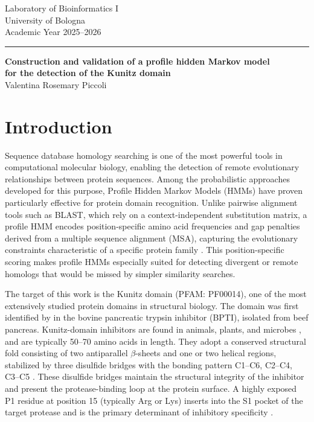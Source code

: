 \documentclass[11pt, a4paper]{article}
\begin{document}
{\centering
\footnotesize
Laboratory of Bioinformatics I \\
University of Bologna \\
Academic Year 2025--2026\par}




\noindent\rule{\textwidth}{0.4pt} %

\begin{center}
    {\Large\textbf{Construction and validation of a profile hidden Markov model\\
    for the detection of the Kunitz domain}} \\[8pt]
    {\normalsize Valentina Rosemary Piccoli}
\end{center}



\section{Introduction}
Sequence database homology searching is one of the most powerful tools in computational molecular biology, enabling the detection of remote 
evolutionary relationships between protein sequences. Among the probabilistic approaches developed for this purpose, Profile Hidden Markov 
Models (HMMs) have proven particularly effective for protein domain recognition. Unlike pairwise alignment tools such as BLAST, which rely on 
a context-independent substitution matrix, a profile HMM encodes position-specific amino acid frequencies and gap penalties derived from a 
multiple sequence alignment (MSA), capturing the evolutionary constraints characteristic of a specific protein family \cite{Eddy2011}. This 
position-specific scoring makes profile HMMs especially suited for detecting divergent or remote homologs that would be missed by simpler 
similarity searches.

The target of this work is the Kunitz domain (PFAM: PF00014), one of the most extensively studied protein domains in structural biology. The 
domain was first identified by \cite{Kunitz1936} in the bovine pancreatic trypsin inhibitor (BPTI), isolated from beef pancreas. Kunitz-domain 
inhibitors are found in animals, plants, and microbes \cite{Laskowski1980}, and are typically 50--70 amino acids in length. They adopt a 
conserved structural fold consisting of two antiparallel $\beta$-sheets and one or two helical regions, stabilized by three disulfide bridges 
with the bonding pattern C1--C6, C2--C4, C3--C5 \cite{Mishra2020}.
These disulfide bridges maintain the structural integrity of the inhibitor and present the protease-binding loop at the protein surface. 
A highly exposed P1 residue at position 15 (typically Arg or Lys) inserts into the S1 pocket of the target protease and is the primary 
determinant of inhibitory specificity \cite{Ascenzi2003}.
\end{document}
